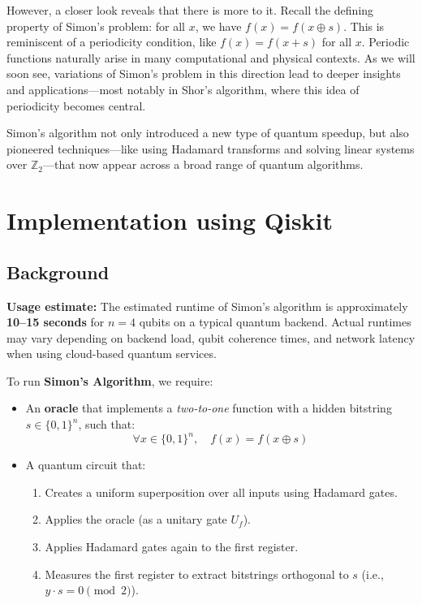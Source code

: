 However, a closer look reveals that there is more to it. Recall the defining property of Simon's problem: for all $x$, we have $f(x) = f(x \oplus s)$. This is reminiscent of a periodicity condition, like $f(x) = f(x + s)$ for all $x$. Periodic functions naturally arise in many computational and physical contexts. As we will soon see, variations of Simon's problem in this direction lead to deeper insights and applications—most notably in Shor's algorithm, where this idea of periodicity becomes central.

Simon's algorithm not only introduced a new type of quantum speedup, but also pioneered techniques—like using Hadamard transforms and solving linear systems over $\mathbb{Z}_2$—that now appear across a broad range of quantum algorithms.

\section{Implementation using Qiskit}
\subsection{Background}

\textbf{Usage estimate:} The estimated runtime of Simon’s algorithm is approximately \textbf{10--15 seconds} for $n = 4$ qubits on a typical quantum backend. Actual runtimes may vary depending on backend load, qubit coherence times, and network latency when using cloud-based quantum services.

To run \textbf{Simon’s Algorithm}, we require:

\begin{itemize}
    \item An \textbf{oracle} that implements a \textit{two-to-one} function with a hidden bitstring $s \in \{0,1\}^n$, such that:
    \[
    \forall x \in \{0,1\}^n,\quad f(x) = f(x \oplus s)
    \]
    
    \item A quantum circuit that:
    \begin{enumerate}
        \item Creates a uniform superposition over all inputs using Hadamard gates.
        \item Applies the oracle (as a unitary gate $U_f$).
        \item Applies Hadamard gates again to the first register.
        \item Measures the first register to extract bitstrings orthogonal to $s$ (i.e., $y \cdot s = 0 \pmod{2}$).
    \end{enumerate}
\end{itemize}

